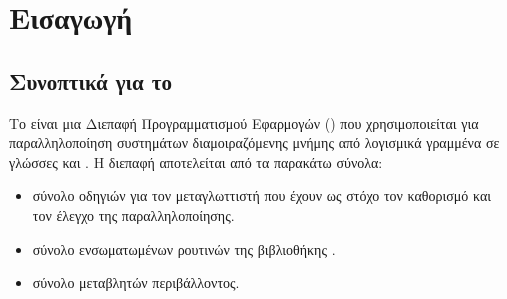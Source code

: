\clearpage
\section{Εισαγωγή}
\subsection{Συνοπτικά για το }
Το  είναι μια Διεπαφή Προγραμματισμού Εφαρμογών (\emph{}) που χρησιμοποιείται για
παραλληλοποίηση συστημάτων διαμοιραζόμενης μνήμης από λογισμικά γραμμένα σε γλώσσες
\textbf{} και \textbf{}. Η διεπαφή αποτελείται από τα παρακάτω
σύνολα\cite{thenextstep20}:
\begin{spacing}{1.1}
\begin{itemize}
    \item σύνολο οδηγιών \textbf{} για τον μεταγλωττιστή που έχουν ως στόχο τον
    καθορισμό και τον έλεγχο της παραλληλοποίησης.
    \item σύνολο ενσωματωμένων ρουτινών της βιβλιοθήκης .
    \item σύνολο μεταβλητών περιβάλλοντος.
\end{itemize}
\end{spacing}


